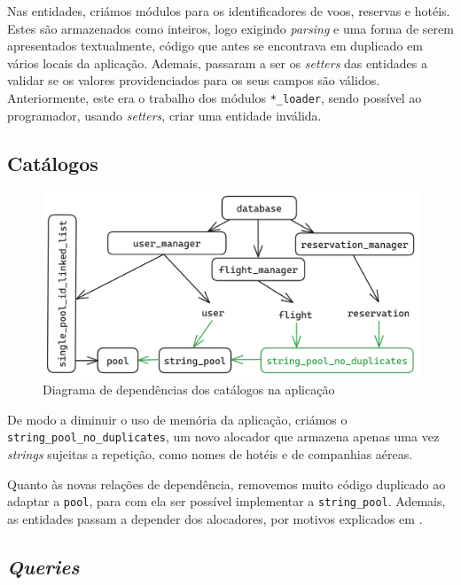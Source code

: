 \documentclass[12pt, a4paper]{article}
\begin{document}
Nas entidades, criámos módulos para os identificadores de voos, reservas e hotéis. Estes são
armazenados como inteiros, logo exigindo \emph{parsing} e uma forma de serem apresentados
textualmente, código que antes se encontrava em duplicado em vários locais da aplicação. Ademais,
passaram a ser os \emph{setters} das entidades a validar se os valores providenciados para os seus
campos são válidos. Anteriormente, este era o trabalho dos módulos \texttt{*\_loader}, sendo
possível ao programador, usando \emph{setters}, criar uma entidade inválida.

\subsection{Catálogos}
\label{sec:catalogs}

\begin{figure}[ht]
    \centering
    \includegraphics[scale=0.17]{res-fase2/database.png}
    \caption{Diagrama de dependências dos catálogos na aplicação}
    \label{fig:catalogs}
\end{figure}

De modo a diminuir o uso de memória da aplicação, criámos o \texttt{string\_pool\_no\_duplicates},
um novo alocador que armazena apenas uma vez \emph{strings} sujeitas a repetição, como nomes de
hotéis e de companhias aéreas.

Quanto às novas relações de dependência, removemos muito código duplicado ao adaptar a
\texttt{pool}, para com ela ser possível implementar a \texttt{string\_pool}. Ademais, as entidades
passam a depender dos alocadores, por motivos explicados em
.

\subsection{\emph{Queries}}
\label{sec:queries}
\end{document}
